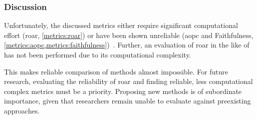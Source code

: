 \subsubsection{Discussion}\label{metrics:discussion}
Unfortunately, the discussed metrics either require significant computational effort (\gls{roar}, \cref{metrics:roar}) or have been shown unreliable (\gls{aopc} and Faithfulness, \cref{metrics:aopc,metrics:faithfulness})~\cite{Hooker.2019,Tomsett.2019}. Further, an evaluation of \gls{roar} in the like of  has not been performed due to its computational complexity.
\par
This makes reliable comparison of methods almost impossible. For future research, evaluating the reliability of \gls{roar} and finding reliable, less computational complex metrics must be a priority. Proposing new methods is of subordinate importance, given that researchers remain unable to evaluate against preexisting approaches.